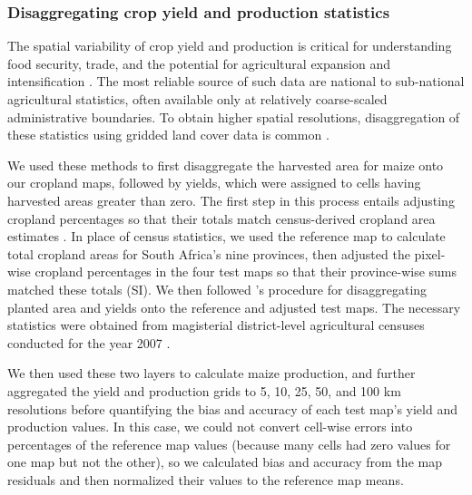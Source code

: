 \documentclass[12 pt, titlepage, a4paper]{article}
\newcommand{\citetapos}[1]{\citeauthor{#1}'s \citeyearpar{#1}}
\begin{document}
\subsubsection*{Disaggregating crop yield and production statistics}
\vspace{-0.2 cm}
The spatial variability of crop yield and production is critical for understanding food security, trade, and the potential for agricultural expansion and intensification \citep{licker_mind_2010,monfreda_farming_2008}. The most reliable source of such data are national to sub-national agricultural statistics, often available only at relatively coarse-scaled administrative boundaries. To obtain higher spatial resolutions, disaggregation of these statistics using gridded land cover data is common \citep{ramankutty_farming_2008, monfreda_farming_2008,schierhorn_post-soviet_2013}. 

We used these methods to first disaggregate the harvested area for maize \citep[South Africa's largest crop;][]{estes_projected_2013} onto our cropland maps, followed by yields, which were assigned to cells having harvested areas greater than zero. The first step in this process entails adjusting cropland percentages so that their totals match census-derived cropland area estimates \citep{ramankutty_farming_2008,schierhorn_post-soviet_2013}. In place of census statistics, we used the reference map to calculate total cropland areas for South Africa's nine provinces, then adjusted the pixel-wise cropland percentages in the four test maps so that their province-wise sums matched these totals (SI). We then followed \citetapos{monfreda_farming_2008} procedure for disaggregating planted area and yields onto the reference and adjusted test maps. The necessary statistics were obtained from magisterial district-level agricultural censuses conducted for the year 2007 \citep{statistics_south_africa_building_2007}. 

We then used these two layers to calculate maize production, and further aggregated the yield and production grids to 5, 10, 25, 50, and 100 km resolutions before quantifying the bias and accuracy of each test map's yield and production values. In this case, we could not convert cell-wise errors into percentages of the reference map values (because many cells had zero values for one map but not the other), so we calculated bias and accuracy from the map residuals and then normalized their values to the reference map means. 

\end{document}
